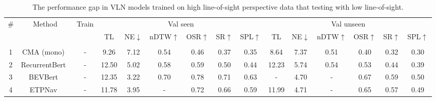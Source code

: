 \begin{table*}[t]
    \footnotesize
    \caption{
    The performance gap in VLN models trained on high line-of-sight perspective data that testing with low line-of-sight. \\
    }
    \label{tab:policy}
    \vspace{-15pt}
    \begin{center}
    \begin{tabular}{ccccccccccccccc}
    \hline
    \toprule


\multirow{2}{*}{\#}&\multirow{2}{*}{Method}& \multirow{2}{*}{Train} & \multicolumn{6}{c}{Val seen} & \multicolumn{6}{c}{Val unseen} \\

    \cmidrule(r){4-9}
    \cmidrule(r){10-15}
&  ~ & ~ & TL& NE$\downarrow$ & nDTW$\uparrow$& OSR$\uparrow$& SR$\uparrow$& SPL$\uparrow$& TL& NE$\downarrow$& nDTW$\uparrow$& OSR$\uparrow$& SR$\uparrow$&SPL$\uparrow$\\
  \midrule

\rowcolor{Cerulean!20}\multicolumn{15}{l}{{Evaluate with Hight Line-of-Sight:}}\\


1 &CMA (mono)~\cite{krantz2020beyond} & - & 9.26& 7.12& 0.54& 0.46& 0.37& 0.35& 8.64& 7.37& 0.51& 0.40& 0.32& 0.30\\
2 &RecurrentBert~\cite{hong2022bridging}& - & 12.50 & 5.02& 0.58 & 0.59& 0.50& 0.44& 12.23& 5.74& 0.54& 0.53& 0.44& 0.39\\
3 & BEVBert~\cite{an2022bevbert}& - & 12.35 & 3.22 & 0.70& 0.78& 0.71& 0.63& -& 4.70& -& 0.67& 0.59& 0.50\\ 
4 &ETPNav~\cite{an2023etpnav} & - & 11.78& 3.95& -& 0.72& 0.66& 0.59& 11.99& 4.71& -& 0.65& 0.57& 0.49\\ 


\end{tabular}
\end{center}
\end{table*}
